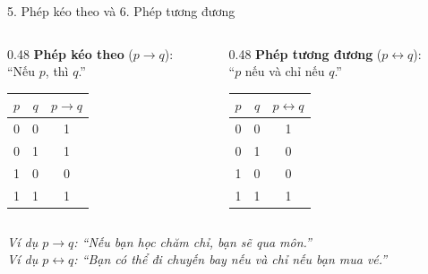 \documentclass[aspectratio=169, 11pt]{beamer}
\begin{document}
\begin{frame}{5. Phép kéo theo và 6. Phép tương đương}
\begin{columns}[t, onlytextwidth]
  \begin{column}{0.48\textwidth}
    \textbf{Phép kéo theo} ($p \rightarrow q$):\\
    ``Nếu $p$, thì $q$.''

    \vspace{0.25cm}
    \centering
    \begin{tabular}{|c|c|c|}
    \hline
    $p$ & $q$ & $p \rightarrow q$ \\
    \hline
    0 & 0 & 1 \\
    0 & 1 & 1 \\
    1 & 0 & 0 \\
    1 & 1 & 1 \\
    \hline
    \end{tabular}
  \end{column}
  \begin{column}{0.48\textwidth}
    \textbf{Phép tương đương} ($p \leftrightarrow q$):\\
    ``$p$ nếu và chỉ nếu $q$.''

    \vspace{0.25cm}
    \centering
    \begin{tabular}{|c|c|c|}
    \hline
    $p$ & $q$ & $p \leftrightarrow q$ \\
    \hline
    0 & 0 & 1 \\
    0 & 1 & 0 \\
    1 & 0 & 0 \\
    1 & 1 & 1 \\
    \hline
    \end{tabular}
  \end{column}
\end{columns}

\vspace{0.4cm}
\textit{Ví dụ $p \rightarrow q$: ``Nếu bạn học chăm chỉ, bạn sẽ qua môn.''}\\
\textit{Ví dụ $p \leftrightarrow q$: ``Bạn có thể đi chuyến bay nếu và chỉ nếu bạn mua vé.''}
\end{frame}
\end{document}
